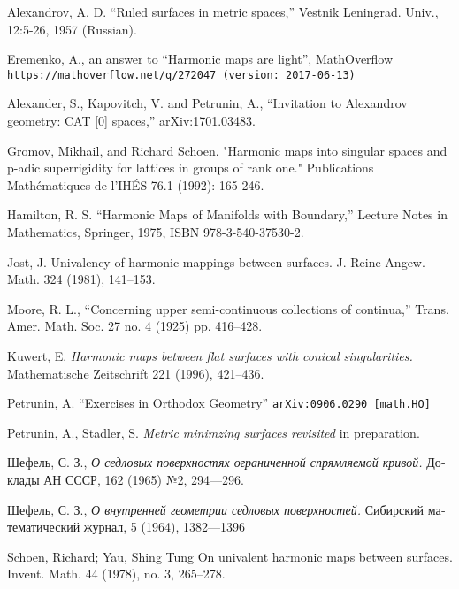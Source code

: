 \documentclass{article}
\begin{document}


\begin{thebibliography}{52}

 Alexandrov, A. D. ``Ruled  surfaces  in  metric  spaces,'' Vestnik Leningrad. Univ., 12:5-26, 1957 (Russian).

 Eremenko, A.,  
an answer to ``Harmonic maps are light'', MathOverflow
\texttt{https://mathoverflow.net/q/272047 (version: 2017-06-13)}

Alexander, S., Kapovitch, V. and Petrunin, A.,
``Invitation to Alexandrov geometry: CAT [0] spaces,''
arXiv:1701.03483.

 Gromov, Mikhail, and Richard Schoen. "Harmonic maps into singular spaces and p-adic superrigidity for lattices in groups of rank one." Publications Mathématiques de l'IHÉS 76.1 (1992): 165-246.

 Hamilton, R. S. ``Harmonic Maps of Manifolds with Boundary,'' Lecture Notes in Mathematics, Springer, 1975, ISBN 978-3-540-37530-2.

 Jost, J.
Univalency of harmonic mappings between surfaces.
J. Reine Angew. Math. 324 (1981), 141--153.

Moore, R. L.,
``Concerning upper semi-continuous collections of continua,''
Trans. Amer. Math. Soc. 27 no. 4 (1925) pp. 416--428.

 Kuwert, E.
\textit{Harmonic maps between flat surfaces with conical singularities.}
Mathematische Zeitschrift 221 (1996), 421--436.



 Petrunin, A. 
``Exercises in Orthodox Geometry''
{\tt arXiv:0906.0290 [math.HO]}

 Petrunin, A., Stadler, S. \textit{Metric minimzing surfaces revisited}
in preparation.

\begin{otherlanguage}{russian}
Шефель, С. З.,
\textit{О седловых поверхностях ограниченной спрямляемой кривой.}
Доклады АН СССР, 162 (1965) №2, 
294---296.
\end{otherlanguage}

\begin{otherlanguage}{russian}
Шефель, С. З., 
\textit{О внутренней геометрии седловых поверхностей.}
Сибирский математический журнал, 5 (1964), 1382---1396
\end{otherlanguage}

 Schoen, Richard; Yau, Shing Tung
On univalent harmonic maps between surfaces.
Invent. Math. 44 (1978), no. 3, 265--278. 

\end{thebibliography}
\end{document}
